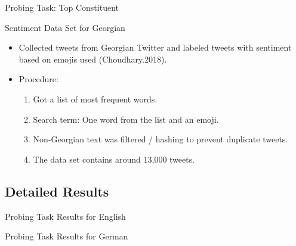 \documentclass[accentcolor=tud1a,colorbacktitle,inverttitle,landscape,german,presentation,t]{tudbeamer}
\begin{document}
\begin{frame}{Probing Task: Top Constituent}{}
	\vspace*{-3mm}
\end{frame}


\begin{frame}{Sentiment Data Set for Georgian}{}
	\vspace*{-4mm}
	\begin{itemize}\setlength\itemsep{1em}
		\item Collected tweets from Georgian Twitter and labeled tweets with sentiment based on emojis used
			(Choudhary.2018).
		\vspace*{2mm}
		
		\item Procedure:
		\begin{enumerate}
			\item Got a list of most frequent words.
			\item Search term: One word from the list and an emoji.
			\item Non-Georgian text was filtered / hashing to prevent duplicate tweets.
			\item The data set contains around 13,000 tweets.
		\end{enumerate}
	\end{itemize}
\end{frame}


\subsection*{Detailed Results}


\begin{frame}{Probing Task Results for English}{}
	\vspace*{-8mm}
	
\end{frame}


\begin{frame}{Probing Task Results for German}{}
	\vspace*{-8mm}
	
\end{frame}
\end{document}
